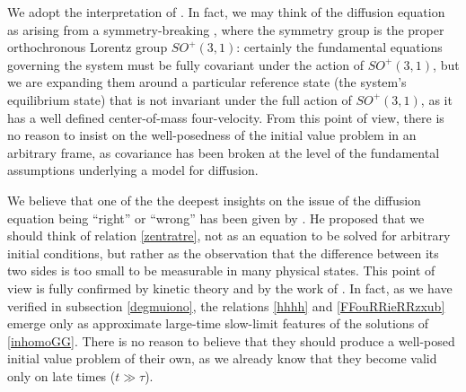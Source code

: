\documentclass[a4paper, amsfonts, amssymb, amsmath, reprint, twocolumn, showkeys, nofootinbib]{revtex4-2}
\begin{document}
We adopt the interpretation of \citet{Kost2000}. In fact, we may think of the diffusion equation as arising from a symmetry-breaking \cite{Ojima1986}, where the symmetry group is the proper orthochronous Lorentz group $SO^+(3,1)$: certainly the fundamental equations governing the system must be fully covariant under the action of $SO^+(3,1)$, but we are expanding them around a particular reference state (the system's equilibrium state) that is not invariant under the full action of $SO^+(3,1)$, as it has a well defined center-of-mass four-velocity.
From this point of view, there is no reason to insist on the well-posedness of the initial value problem in an arbitrary frame, as covariance has been broken at the level of the fundamental assumptions underlying a model for diffusion.

We believe that one of the the deepest insights on the issue of the diffusion equation being ``right'' or ``wrong'' has been given by \citet{Geroch95}. He proposed that we should think of relation \eqref{zentratre}, not as an equation to be solved for arbitrary initial conditions, but rather as the observation that the difference between its two sides is too small to be measurable in many physical states. This point of view is fully confirmed by kinetic theory and by the work of \citet{LindblomRelaxation1996}. In fact, as we have verified in subsection \ref{degmuiono}, the relations \eqref{hhhh} and \eqref{FFouRRieRRzxub} emerge only as approximate large-time slow-limit features of the solutions of \eqref{inhomoGG}. There is no reason to believe that they should produce a well-posed initial value problem of their own, as we already know that they become valid only on late times ($t \gg \tau$).  
\end{document}
